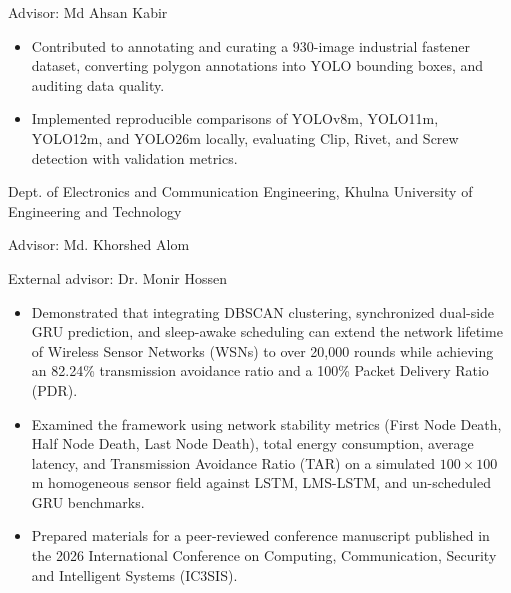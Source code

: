 Advisor: Md Ahsan Kabir\par
\begin{itemize}
  \item Contributed to annotating and curating a 930-image industrial fastener dataset, converting polygon annotations into YOLO bounding boxes, and auditing data quality.
  \item Implemented reproducible comparisons of YOLOv8m, YOLO11m, YOLO12m, and YOLO26m locally, evaluating Clip, Rivet, and Screw detection with validation metrics.
\end{itemize}
\vspace{0.15em}
Dept. of Electronics and Communication Engineering, Khulna University of Engineering and Technology\par
Advisor: Md. Khorshed Alom\par
External advisor: Dr. Monir Hossen\par
\begin{itemize}
  \item Demonstrated that integrating DBSCAN clustering, synchronized dual-side GRU prediction, and sleep-awake scheduling can extend the network lifetime of Wireless Sensor Networks (WSNs) to over 20,000 rounds while achieving an 82.24\% transmission avoidance ratio and a 100\% Packet Delivery Ratio (PDR).
  \item Examined the framework using network stability metrics (First Node Death, Half Node Death, Last Node Death), total energy consumption, average latency, and Transmission Avoidance Ratio (TAR) on a simulated \(100\times100\) m homogeneous sensor field against LSTM, LMS-LSTM, and un-scheduled GRU benchmarks.
  \item Prepared materials for a peer-reviewed conference manuscript published in the 2026 International Conference on Computing, Communication, Security and Intelligent Systems (IC3SIS).
\end{itemize}
